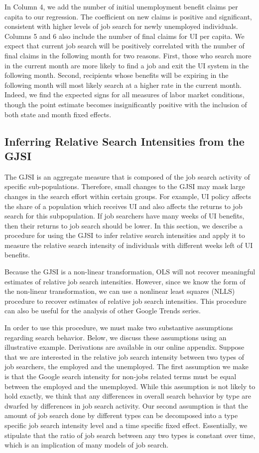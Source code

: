 \documentclass[12pt]{article}
\begin{document}
\begin{spacing}{2}
In Column 4, we add the number of initial unemployment benefit claims per capita to our regression. The coefficient on new claims is positive and significant, consistent with higher levels of job search for newly unemployed individuals. Columns 5 and 6 also include the number of final claims for UI per capita. We expect that current job search will be positively correlated with the number of final claims in the following month for two reasons. First, those who search more in the current month are more likely to find a job and exit the UI system in the following month. Second, recipients whose benefits will be expiring in the following month will most likely search at a higher rate in the current month. Indeed, we find the expected signs for all measures of labor market conditions, though the point estimate becomes insignificantly positive with the inclusion of both state and month fixed effects.


\subsection{Inferring Relative Search Intensities from the GJSI}\label{sec:nlls}
The GJSI is an aggregate measure that is composed of the job search activity of specific sub-populations. Therefore, small changes to the GJSI may mask large changes in the search effort within certain groups. For example, UI policy affects the share of a population which receives UI and also affects the returns to job search for this subpopulation. If job searchers have many weeks of UI benefits, then their returns to job search should be lower. In this section, we describe a procedure for using the GJSI to infer relative search intensities and apply it to measure the relative search intensity of individuals with different weeks left of UI benefits.

Because the GJSI is a non-linear transformation, OLS will not recover meaningful estimates of relative job search intensities. However, since we know the form of the non-linear transformation, we can use a nonlinear least squares (NLLS) procedure to recover estimates of relative job search intensities. This procedure can also be useful for the analysis of other Google Trends series.

In order to use this procedure, we must make two substantive assumptions regarding search behavior. Below, we discuss these assumptions using an illustrative example. Derivations are available in our online appendix. Suppose that we are interested in the relative job search intensity between two types of job searchers, the employed and the unemployed. The first assumption we make is that the Google search intensity for non-jobs related terms must be equal between the employed and the unemployed. While this assumption is not likely to hold exactly, we think that any differences in overall search behavior by type are dwarfed by differences in job search activity. Our second assumption is that the amount of job search done by different types can be decomposed into a type specific job search intensity level and a time specific fixed effect. Essentially, we stipulate that the ratio of job search between any two types is constant over time, which is an implication of many models of job search.


\end{spacing}
\end{document}

